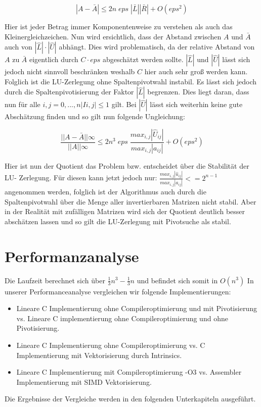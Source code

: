 \documentclass[course=erap]{aspdoc}
\begin{document}
 \begin{equation}
\label{eg3}
|A - \bar{A}| \leq 2n \; eps \; |\bar{L}||\bar{R}| + O(eps^2)
\end{equation}

Hier ist jeder Betrag immer Komponentenweise zu verstehen als auch das Kleinergleichzeichen.										%
Nun wird ersichtlich, dass der Abstand zwischen $A$ und $\bar{A}$ auch von $|\hat{L}| \cdot |\hat{U}|$
abhängt. Dies wird problematisch, da der relative Abstand von $A$ zu $\bar{A}$ eigentlich durch 
$C\cdot eps$ abgeschätzt werden sollte. $|\hat{L}|$ und $|\hat{U}|$ lässt sich jedoch nicht sinnvoll 
beschränken weshalb $C$ hier auch sehr groß werden kann.
Folglich ist die LU-Zerlegung ohne Spaltenpivotwahl instabil. Es lässt sich jedoch durch die Spaltenpivotisierung 
der Faktor $|\hat{L}|$  begrenzen. Dies liegt daran, dass nun für alle $i,j = 0,...,n |Ii,j| \leq 1$ gilt. 
Bei $|\hat{U}|$ lässt sich weiterhin keine gute Abschätzung finden und so gilt nun folgende Ungleichung:  

 \begin{equation}
\label{eg3}
\frac{||A - \bar{A}||\infty}{||A||\infty} \leq 2n^3 \; eps \;\frac{max_{i,j}| \hat{U}_{ij}|}{max_{i,j}|a_{ij}|} + O(eps^2)
\end{equation}


Hier ist nun der Quotient das Problem bzw. entscheidet über die Stabilität der LU-
Zerlegung. Für diesen kann jetzt jedoch nur: $\frac{max_{i,j}| \hat{u}_{ij}|}{max_{i,j}|a_{ij}|} <= 2^{n-1}$ angenommen 
werden, folglich ist der Algorithmus auch durch die Spaltenpivotwahl über die Menge 
aller invertierbaren Matrizen nicht stabil. Aber in der Realität mit zufälligen Matrizen wird 
sich der Quotient deutlich besser abschätzen lassen und so gilt die LU-Zerlegung mit Pivotsuche als stabil.


\section{Performanzanalyse}
\label{Performanzanalyse}
Die Laufzeit berechnet sich über  $ \frac{1}{3}n^3 -\frac{1}{3} n $ und befindet sich somit in $O(n^3)$ \cite{LULaufzeit}
In unserer Performanceanalyse vergleichen wir folgende Implementierungen:\\
\begin{itemize}
\item Lineare C Implementierung ohne Compileroptimierung und mit Pivotisierung vs. Lineare C implementierung ohne Compileroptimierung und ohne Pivotisierung. 
\item Lineare C Implementierung ohne Compileroptimierung vs. C Implementierung mit Vektorisierung durch Intrinsics. 
\item Lineare C Implementierung mit Compileroptimierung -O3 vs. Assembler Implementierung mit SIMD Vektorisierung.
\end{itemize}
Die Ergebnisse der Vergleiche werden in den folgenden Unterkapiteln ausgeführt. \\
\end{document}
